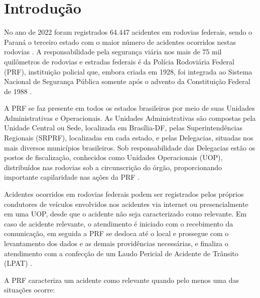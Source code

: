 \chapter{Introdução}

No ano de 2022 foram registrados 64.447 acidentes em rodovias federais, sendo o Paraná o terceiro estado com o maior número de acidentes ocorridos nestas rodovias \cite{AcidentesCNT}. A responsabilidade pela segurança viária nos mais de 75 mil quilômetros de rodovias e estradas federais é da Polícia Rodoviária Federal (PRF), instituição policial que, embora criada em 1928, foi integrada ao Sistema Nacional de Segurança Pública somente após o advento da Constituição Federal de 1988 \cite{InstitucionalPRF}.


A PRF se faz presente em todos os estados brasileiros por meio de suas Unidades Administrativas e Operacionais. As Unidades Administrativas são compostas pela Unidade Central ou Sede, localizada em Brasília-DF, pelas Superintendências Regionais (SRPRF), localizadas em cada estado, e pelas Delegacias, situadas nos mais diversos municípios brasileiros. Sob responsabilidade das Delegacias estão os postos de fiscalização, conhecidos como Unidades Operacionais (UOP), distribuídos nas rodovias sob a circunscrição do órgão, proporcionando importante capilaridade nas ações da PRF \cite{CidadaoPRF}.


Acidentes ocorridos em rodovias federais podem ser registrados pelos próprios condutores de veículos envolvidos nos acidentes via internet ou presencialmente em uma UOP, desde que o acidente não seja caracterizado como relevante. Em caso de acidente relevante, o atendimento é iniciado com o recebimento da comunicação, em seguida a PRF se desloca até o local e prossegue com o levantamento dos dados e as demais providências necessárias, e finaliza o atendimento com a confecção de um Laudo Pericial de Acidente de Trânsito (LPAT) \cite{DATPRF, LPATPRF}. 


A PRF caracteriza um acidente como relevante quando pelo menos uma das situações ocorre:

